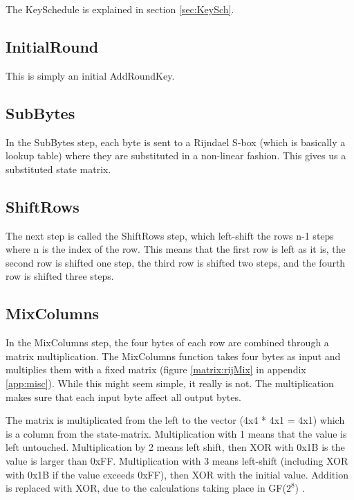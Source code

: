 The KeySchedule is explained in section \ref{sec:KeySch}.

\subsection{InitialRound}
This is simply an initial AddRoundKey.

\subsection{SubBytes}
In the SubBytes step, each byte is sent to a Rijndael S-box (which is basically
 a lookup table) where they are substituted in a non-linear fashion. This gives 
us a substituted state matrix.

\subsection{ShiftRows}
The next step is called the ShiftRows step, which left-shift the rows n-1 
steps where n is the index of the row. This means that the first row is left 
as it is, the second row is shifted one step, the third row is shifted two 
steps, and the fourth row is shifted three steps.

\subsection{MixColumns}
In the MixColumns step, the four bytes of each row are combined through a matrix 
multiplication. The MixColumns function takes four bytes as input and multiplies 
them with a fixed matrix (figure \ref{matrix:rijMix} in appendix 
\ref{app:misc}). While this might seem simple, it really is not. The 
multiplication makes sure that each input byte affect all output bytes.
\citep{Angelfire}

The matrix is multiplicated from the left to the vector (4x4 * 4x1 = 4x1) which 
is a column from the state-matrix. Multiplication with 1 means that the value 
is left untouched. Multiplication by 2 means left shift, then XOR with 0x1B is 
the value is larger than 0xFF. Multiplication with 3 means left-shift (including 
XOR with 0x1B if the value exceeds 0xFF), then XOR with the initial value. 
Addition is replaced with XOR, due to the calculations taking place in 
GF(\(2^8\)) .



